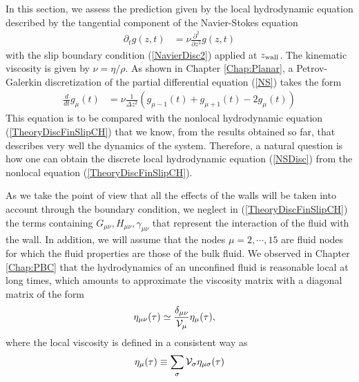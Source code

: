 \documentclass[b5paper,openright,10pt]{book}
\begin{document}
In  this  section,  we  assess  the  prediction  given  by  the  local
hydrodynamic  equation described  by the  tangential component  of the
Navier-Stokes equation
\begin{align}
  \partial_t g(z,t)&=\nu\frac{\partial^2}{\partial z^2} g(z,t)
\label{NS}
\end{align}
with  the  slip  boundary  condition  (\ref{NavierDisc2})  applied  at
$z_{\rm    wall}$.    The    kinematic   viscosity    is   given    by
$\nu=\eta/\rho$. As  shown in Chapter \ref{Chap:Planar}, a  Petrov-Galerkin discretization of
the partial differential equation (\ref{NS}) takes the form
\begin{align}
  \frac{d}{dt}g_\mu(t)&=\nu \frac{1}{\Delta z^2}(g_{\mu-1}(t)+g_{\mu+1}(t)-2g_{\mu}(t))
\label{NSDisc}
\end{align}
This  equation  is to  be  compared  with the  nonlocal  hydrodynamic
equation (\ref{TheoryDiscFinSlipCH}) that we know, from the results obtained
so   far,   that   describes   very   well   the   dynamics   of   the
system.  Therefore, a  natural  question  is how  one  can obtain  the
discrete local hydrodynamic equation (\ref{NSDisc}) from the nonlocal
equation (\ref{TheoryDiscFinSlipCH}).

As we take the point of view that all the effects of the walls will be taken
into account through the boundary  condition, we neglect in
(\ref{TheoryDiscFinSlipCH})          the           terms          containing
$G_{\mu\nu},H_{\mu\nu},\gamma_{\mu\nu}$ that represent the interaction
of the  fluid with  the wall. In addition, we will assume that
 the  nodes
$\mu=2,\cdots,15$   are   fluid   nodes for which the fluid properties are those
of the bulk fluid.
We observed in Chapter \ref{Chap:PBC}
that the hydrodynamics  of an unconfined fluid is  reasonable local at
long times, which  amounts to approximate the viscosity  matrix with a
diagonal matrix of the form
\begin{align}
  \eta_{\mu\nu}(\tau)&\simeq\frac{\delta_{\mu\nu}}{{\cal V}_\mu}\eta_\mu(\tau),
\label{etadiag}
\end{align}
where the local viscosity is defined in a consistent way as
\begin{align}
\eta_\mu(\tau)\equiv\sum_\sigma{\cal V}_\sigma \eta_{\mu\sigma}(\tau)
\label{LocVisc}
\end{align}
%
\end{document}
